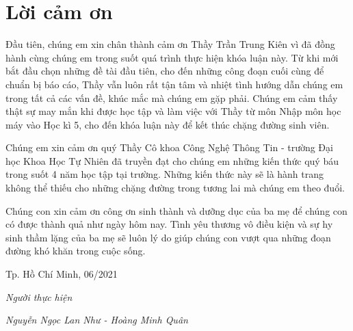 \chapter*{Lời cảm ơn}
\label{thanks}

Đầu tiên, chúng em xin chân thành cảm ơn Thầy Trần Trung Kiên vì đã đồng hành cùng chúng em trong suốt quá trình thực hiện khóa luận này. Từ khi mới bắt đầu chọn những đề tài đầu tiên, cho đến những công đoạn cuối cùng để chuẩn bị báo cáo, Thầy vẫn luôn rất tận tâm và nhiệt tình hướng dẫn chúng em trong tất cả các vấn đề, khúc mắc mà chúng em gặp phải. Chúng em cảm thấy thật sự may mắn khi được học tập và làm việc với Thầy từ môn Nhập môn học máy vào Học kì 5, cho đến khóa luận này để kết thúc chặng đường sinh viên.

Chúng em xin cảm ơn quý Thầy Cô khoa Công Nghệ Thông Tin - trường Đại học Khoa Học Tự Nhiên đã truyền đạt cho chúng em những kiến thức quý báu trong suốt 4 năm học tập tại trường. Những kiến thức này sẽ là hành trang không thể thiếu cho những chặng đường trong tương lai mà chúng em theo đuổi.

Chúng con xin cảm ơn công ơn sinh thành và dưỡng dục của ba mẹ để chúng con có được thành quả như ngày hôm nay. Tình yêu thương vô điều kiện và sự hy sinh thầm lặng của ba mẹ sẽ luôn lý do giúp chúng con vượt qua những đoạn đường khó khăn trong cuộc sống.

\hfill Tp. Hồ Chí Minh, 06/2021

\hfill \textit{Người thực hiện}

\hfill \textit{Nguyễn Ngọc Lan Như - Hoàng Minh Quân}